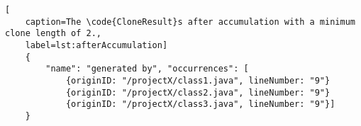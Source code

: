 
\begin{lstlisting}[
	caption=The \code{CloneResult}s after accumulation with a minimum clone length of 2.,
	label=lst:afterAccumulation]
	{		
		"name": "generated by", "occurrences": [
			{originID: "/projectX/class1.java", lineNumber: "9"}
			{originID: "/projectX/class2.java", lineNumber: "9"}
			{originID: "/projectX/class3.java", lineNumber: "9"}]
	}
\end{lstlisting}